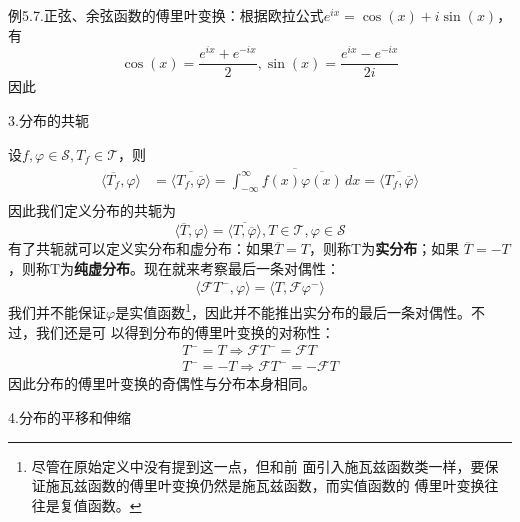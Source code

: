 \documentclass{ctexbook}
\begin{document}
\noindent 例5.7.正弦、余弦函数的傅里叶变换：根据欧拉公式$e^{ix}=\cos(x)+i\sin(x)$，
有\[\cos(x)=\frac{e^{ix}+e^{-ix}}{2},\sin(x)=\frac{e^{ix}-e^{-ix}}{2i}\]因此

\noindent 3.分布的共轭

设$f,\varphi\in\mathcal{S} ,T_f\in\mathcal{T} $，则
\begin{align*}
    \langle \overline{T_f},\varphi\rangle & =\overline{\langle T_f,\overline{\varphi}\rangle}=\overline{\int_{-\infty}^{\infty}f(x)\overline{\varphi(x)}\,dx}=\overline{\langle T_f,\overline{\varphi}\rangle} \\
\end{align*}
因此我们定义分布的共轭为
\begin{equation}
    \langle \overline{T},\varphi\rangle=\overline{\langle T,\overline{\varphi}\rangle},T\in\mathcal{T} ,\varphi\in\mathcal{S}
\end{equation}
有了共轭就可以定义实分布和虚分布：如果$\overline{T}=T$，则称T为\textbf{实分布}；如果
$\overline{T}=-T$，则称T为\textbf{纯虚分布}。现在就来考察最后一条对偶性：
\begin{align*}
    \langle\mathcal{F}T^-,\varphi\rangle =\langle T,\mathcal{F}\varphi^-\rangle
\end{align*}
我们并不能保证$\varphi$是实值函数\footnote{尽管在原始定义中没有提到这一点，但和前
    面引入施瓦兹函数类一样，要保证施瓦兹函数的傅里叶变换仍然是施瓦兹函数，而实值函数的
    傅里叶变换往往是复值函数。}，因此并不能推出实分布的最后一条对偶性。不过，我们还是可
以得到分布的傅里叶变换的对称性：
\begin{align*}
    T^-=T\Rightarrow\mathcal{F} T^-=\mathcal{F} T \\
    T^-=-T\Rightarrow\mathcal{F} T^-=-\mathcal{F} T
\end{align*}
因此分布的傅里叶变换的奇偶性与分布本身相同。

\noindent 4.分布的平移和伸缩
\end{document}
